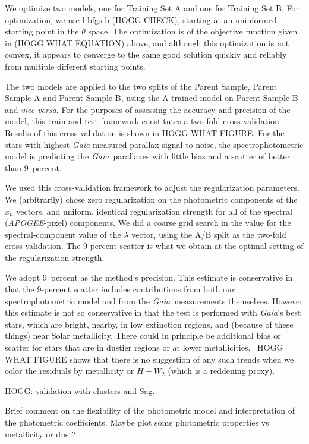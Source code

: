 \documentclass[modern]{aastex62}
\newcommand{\code}[1]{\texttt{\detokenize{#1}}}
\newcommand{\foreign}[1]{\textsl{#1}}
\newcommand{\acronym}[1]{{\small{#1}}}
\newcommand{\project}[1]{\textsl{#1}}
\newcommand{\apogee}{\project{\acronym{APOGEE}}}
\newcommand{\gaia}{\project{Gaia}}
\begin{document}
We optimize two models, one for Training Set A and one for Training Set B.
For optimization, we use \code{scipy} l-bfgs-b (HOGG CHECK), starting at
an uninformed starting point in the $\theta$ space.
The optimization is of the objective function given in (HOGG WHAT EQUATION) above,
and although this optimization is not convex, it appears to converge to the
same good solution quickly and reliably from multiple different starting points.

The two models are applied to the two splits of the Parent Sample, Parent Sample
A and Parent Sample B, using the A-trained model on Parent Sample B and
\foreign{vice versa}.
For the purposes of assessing the accuracy and precision of the model, this
train-and-test framework constitutes a two-fold cross-validation.
Results of this cross-validation is shown in HOGG WHAT FIGURE.
For the stars with highest \gaia-measured parallax signal-to-noise,
the spectrophotometric model is predicting the \gaia\ parallaxes with little bias
and a scatter of better than 9~percent.

We used this cross-validation framework to adjust the regularization parameters.
We (arbitrarily) chose zero regularization on the photometric components of the
$x_n$ vectors, and uniform, identical regularization strength for all of the
spectral (\apogee-pixel) components.
We did a coarse grid search in the value for the spectral-component value of the
$\lambda$ vector, using the A/B split as the two-fold cross-validation.
The 9-percent scatter is what we obtain at the optimal setting of the regularization
strength.

We adopt 9~percent as the method's precision.
This estimate is conservative in that the 9-percent scatter includes contributions
from both our spectrophotometric model and from the \gaia\ measurements themselves.
However this estimate is not so conservative in that the test is performed with
\gaia's best stars, which are bright, nearby, in low extinction regions, and
(because of these things) near Solar metallicity.
There could in principle be additional bias or scatter for stars that are in dustier
regions or at lower metallicities.
\figurename~HOGG WHAT FIGURE shows that
there is no suggestion of any such trends when we color the residuals by metallicity
or $H-W_2$ (which is a reddening proxy).

HOGG: validation with clusters and Sag.

Brief comment on the flexibility of the photometric model and interpretation of the photometric coefficients. Maybe plot some photometric properties vs metallicity or dust?
\end{document}
